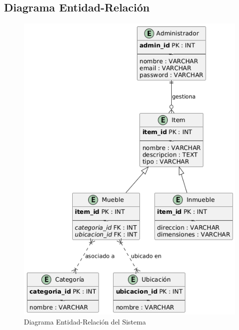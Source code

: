 \documentclass{article}
\begin{document}
\subsection{Diagrama Entidad-Relación}
\begin{figure}[H]
    \center
    \includegraphics[width=\textwidth]{img/EntidadRelacion.png}
    \caption{Diagrama Entidad-Relación del Sistema}
\end{figure}
\end{document}
